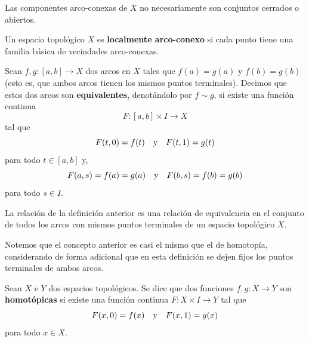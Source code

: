 \documentclass[12pt]{report}
\theoremstyle{largebreak}
\newcommand\cf[3]{\ensuremath{#1:#2\rightarrow#3}}
\begin{document}
    Las componentes arco-conexas de $X$ no necesariamente son conjuntos cerrados o abiertos.

    \begin{mydef}
        Un espacio topológico $X$ es \textbf{localmente arco-conexo} si cada punto tiene una familia básica de vecindades arco-conexas.
    \end{mydef}


    \begin{mydef}
        Sean $\cf{f,g}{[a,b]}{X}$ dos arcos en $X$ tales que $f(a)=g(a)$ y $f(b)=g(b)$ (esto es, que ambos arcos tienen los mismos puntos terminales). Decimos que estos dos arcos son \textbf{equivalentes}, denotándolo por $f\sim g$, si existe una función continua
        \begin{equation*}
            \cf{F}{[a,b]\times I}{X}
        \end{equation*}
        tal que
        \begin{equation*}
            F(t,0)=f(t)\quad\textup{y}\quad F(t,1)=g(t)
        \end{equation*}
        para todo $t\in[a,b]$ y,
        \begin{equation*}
            F(a,s)=f(a)=g(a)\quad\textup{y}\quad F(b,s)=f(b)=g(b)
        \end{equation*}
        para todo $s\in I$.
    \end{mydef}

    \begin{propo}
        La relación de la definición anterior es una relación de equivalencia en el conjunto de todos los arcos con mismos puntos terminales de un espacio topológico $X$.
    \end{propo}

    Notemos que el concepto anterior es casi el mismo que el de homotopía, considerando de forma adicional que en esta definición se dejen fijos los puntos terminales de ambos arcos.

    \begin{mydef}
        Sean $X$ e $Y$ dos espacios topológicos. Se dice que dos funciones $\cf{f,g}{X}{Y}$ son \textbf{homotópicas} si existe una función continua $\cf{F}{X\times I}{Y}$ tal que
        \begin{equation*}
            F(x,0)=f(x)\quad\textup{y}\quad F(x,1)=g(x)
        \end{equation*}
        para todo $x\in X$.
    \end{mydef}
\end{document}
